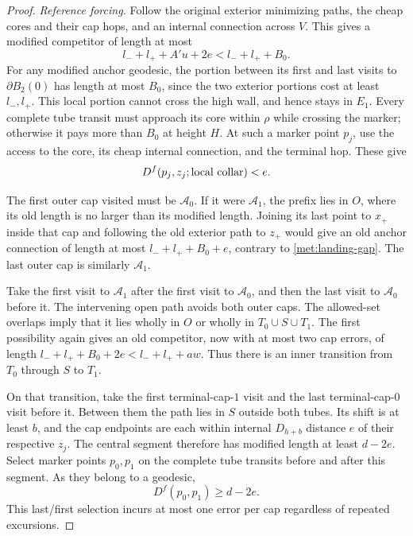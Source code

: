 \documentclass[11pt]{article}
\numberwithin{equation}{section}
\theoremstyle{definition}
\theoremstyle{remark}
\newcommand{\1}{\mathbf 1}
\begin{document}
\begin{proof}
\emph{Reference forcing.}
Follow the original exterior minimizing paths, the cheap cores and
their cap hops, and an internal connection across $V$.  This gives a
modified competitor of length at most
\begin{equation}
 l_-+l_++A'u+2e<l_-+l_++B_0.
 \label{met:gate-budget}
\end{equation}
For any modified anchor geodesic, the portion between its first and
last visits to $\partial B_2(0)$ has length at most $B_0$, since the
two exterior portions cost at least $l_-,l_+$.  This local portion
cannot cross the high wall, and hence stays in $E_1$.  Every complete
tube transit must approach its core within $\rho$ while crossing the
marker; otherwise it pays more than $B_0$ at height $H$.
At such a marker point $p_j$, use the access to the core, its cheap
internal connection, and the terminal hop.  These give
\begin{equation}
 D^f(p_j,z_j;\hbox{local collar})<e.
 \label{met:gate-access}
\end{equation}

The first outer cap visited must be $\mathcal A_0$.  If it were
$\mathcal A_1$, the prefix lies in $O$, where its old length is no
larger than its modified length.  Joining its last point to $x_+$
inside that cap and following the old exterior path to $z_+$ would
give an old anchor connection of length at most
$l_-+l_++B_0+e$, contrary to \eqref{met:landing-gap}.
The last outer cap is similarly $\mathcal A_1$.

Take the first visit to $\mathcal A_1$ after the first visit to
$\mathcal A_0$, and then the last visit to $\mathcal A_0$ before it.
The intervening open path avoids both outer caps.  The allowed-set
overlaps imply that it lies wholly in $O$ or wholly in
$T_0\cup S\cup T_1$.  The first possibility again gives an old
competitor, now with at most two cap errors, of length
$l_-+l_++B_0+2e<l_-+l_++aw$.  Thus there is an inner transition
from $T_0$ through $S$ to $T_1$.

On that transition, take the first terminal-cap-$1$ visit and the
last terminal-cap-$0$ visit before it.  Between them the path lies
in $S$ outside both tubes.  Its shift is at least $b$, and the cap
endpoints are each within internal $D_{h+b}$ distance $e$ of their
respective $z_j$.  The central segment therefore has modified length
at least $d-2e$.  Select marker points $p_0,p_1$ on the complete tube
transits before and after this segment.  As they belong to a
geodesic,
\[
 D^f(p_0,p_1)\geq d-2e.
\]
This last/first selection incurs at most one error per cap regardless
of repeated excursions.


\end{proof}
\end{document}
